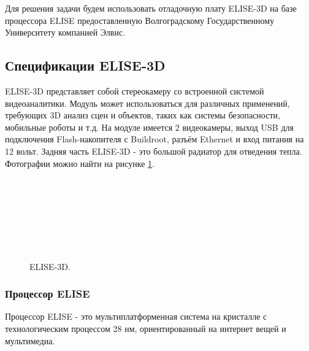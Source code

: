 \documentclass[12pt,a4paper]{scrartcl}
\begin{document}
	Для  решения задачи будем использовать отладочную плату ELISE-3D на базе процессора ELISE предоставленную Волгоградскому Государственному Университету компанией Элвис.
	
	\subsection{Спецификации ELISE-3D}
	
		ELISE-3D представляет собой стереокамеру со встроенной системой видеоаналитики. Модуль может использоваться для различных применений, требующих 3D анализ сцен и объектов, таких как системы безопасности, мобильные роботы и т.д. На модуле имеется 2 видеокамеры, выход USB для подключения Flash-накопителя с Buildroot, разъём Ethernet и вход питания на 12 вольт. Задняя часть ELISE-3D - это большой радиатор для отведения тепла. Фотографии можно найти на рисунке \ref{fig:ELISE-3D}\cite{bib:Chuprikov_NIR}.
		
		\begin{figure}[H]
			\begin{minipage}[h]{0.47\linewidth}
				 \hspace{0.1cm} \\
			\end{minipage}
			\hfill
			\begin{minipage}[h]{0.47\linewidth}
				 \hspace{0.1cm} \\
			\end{minipage}
			\vfill
			\begin{minipage}[h]{0.47\linewidth}
				 \\
			\end{minipage}
			\hfill
			\begin{minipage}[h]{0.47\linewidth}
				 \\
			\end{minipage}
			\caption{ELISE-3D.}
			\label{fig:ELISE-3D}
		\end{figure}
	
		\subsubsection{Процессор ELISE}
		
			Процессор ELISE - это мультиплатформенная система на кристалле с технологическим процессом 28 нм, ориентированный на интернет вещей и мультимедиа.
			
\end{document}
